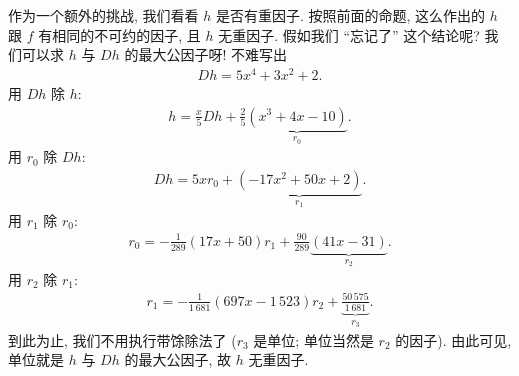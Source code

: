 \begin{example}
    作为一个额外的挑战, 我们看看 $h$ 是否有重因子. 按照前面的命题, 这么作出的 $h$ 跟 $f$ 有相同的不可约的因子, 且 $h$ 无重因子. 假如我们 ``忘记了'' 这个结论呢? 我们可以求 $h$ 与 $Dh$ 的最大公因子呀! 不难写出
    \begin{align*}
        Dh = 5x^4 + 3x^2 + 2.
    \end{align*}
    用 $Dh$ 除 $h$:
    \begin{align*}
        h = \frac{x}{5} Dh + \frac{2}{5} \underbrace{(x^3+4 x-10)}_{r_0}.
    \end{align*}
    用 $r_0$ 除 $Dh$:
    \begin{align*}
        Dh = 5x r_0 + \underbrace{(-17x^2 + 50x + 2)}_{r_1}.
    \end{align*}
    用 $r_1$ 除 $r_0$:
    \begin{align*}
        r_0 = -\frac{1}{289} (17x + 50) r_1 + \frac{90}{289} \underbrace{(41x-31)}_{r_2}.
    \end{align*}
    用 $r_2$ 除 $r_1$:
    \begin{align*}
        r_1 = -\frac{1}{1\,681} (697x - 1\,523) r_2 + \underbrace{\frac{50\,575}{1\,681}}_{r_3}.
    \end{align*}
    到此为止, 我们不用执行带馀除法了 ($r_3$ 是单位; 单位当然是 $r_2$ 的因子). 由此可见, 单位就是 $h$ 与 $Dh$ 的最大公因子, 故 $h$ 无重因子.
\end{example}

